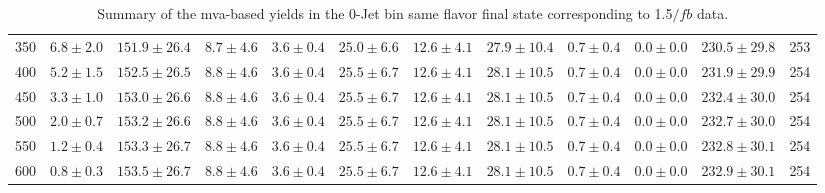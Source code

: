 \begin{table}
{\begin{center}
\begin{tabular}{l c c c c c c c c c c c }
350 & $6.8\pm2.0$ & $151.9\pm26.4$ & $8.7\pm4.6$ & $3.6\pm0.4$ & $25.0\pm6.6$ & $12.6\pm4.1$ & $27.9\pm10.4$ & $0.7\pm0.4$ & $0.0\pm0.0$ & $230.5\pm29.8$ & 253 \\
400 & $5.2\pm1.5$ & $152.5\pm26.5$ & $8.8\pm4.6$ & $3.6\pm0.4$ & $25.5\pm6.7$ & $12.6\pm4.1$ & $28.1\pm10.5$ & $0.7\pm0.4$ & $0.0\pm0.0$ & $231.9\pm29.9$ & 254 \\
450 & $3.3\pm1.0$ & $153.0\pm26.6$ & $8.8\pm4.6$ & $3.6\pm0.4$ & $25.5\pm6.7$ & $12.6\pm4.1$ & $28.1\pm10.5$ & $0.7\pm0.4$ & $0.0\pm0.0$ & $232.4\pm30.0$ & 254 \\
500 & $2.0\pm0.7$ & $153.2\pm26.6$ & $8.8\pm4.6$ & $3.6\pm0.4$ & $25.5\pm6.7$ & $12.6\pm4.1$ & $28.1\pm10.5$ & $0.7\pm0.4$ & $0.0\pm0.0$ & $232.7\pm30.0$ & 254 \\
550 & $1.2\pm0.4$ & $153.3\pm26.7$ & $8.8\pm4.6$ & $3.6\pm0.4$ & $25.5\pm6.7$ & $12.6\pm4.1$ & $28.1\pm10.5$ & $0.7\pm0.4$ & $0.0\pm0.0$ & $232.8\pm30.1$ & 254 \\
600 & $0.8\pm0.3$ & $153.5\pm26.7$ & $8.8\pm4.6$ & $3.6\pm0.4$ & $25.5\pm6.7$ & $12.6\pm4.1$ & $28.1\pm10.5$ & $0.7\pm0.4$ & $0.0\pm0.0$ & $232.9\pm30.1$ & 254 \\
\hline
\end{tabular}
\end{center}
}
\caption{Summary of the mva-based yields in the 0-Jet bin same flavor final state corresponding to 1.5$/fb$ data.}
\end{table}

